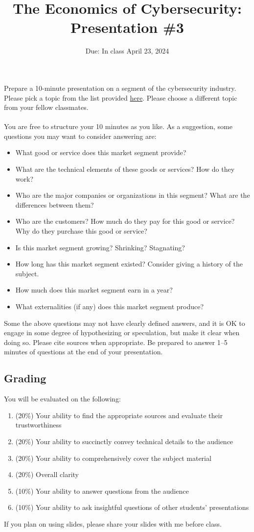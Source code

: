 \documentclass[11pt]{article}
\title{The Economics of Cybersecurity: Presentation \#3}
\author{}
\date{Due: In class April 23, 2024}
\begin{document}
\maketitle

Prepare a 10-minute presentation on a segment of the cybersecurity industry. Please pick a topic from the list provided \href{https://docs.google.com/spreadsheets/d/1SdaMpeCo4CE8o0U_irGhWmVXJYHybRWoiX4uwZYMhCE/edit#gid=2144152383}{here}. Please choose a different topic from your fellow classmates. 
\\
\\
You are free to structure your 10 minutes as you like. As a suggestion, some questions you may want to consider answering are:
\begin{itemize}
    \item What good or service does this market segment provide?
    \item What are the technical elements of these goods or services? How do they work?
    \item Who are the major companies or organizations in this segment? What are the differences between them? 
    \item Who are the customers? How much do they pay for this good or service? Why do they purchase this good or service?
    \item Is this market segment growing? Shrinking? Stagnating?
    \item How long has this market segment existed? Consider giving a history of the subject.
    \item How much does this market segment earn in a year? 
    \item What externalities (if any) does this market segment produce?
\end{itemize}

Some the above questions may not have clearly defined answers, and it is OK to engage in some degree of hypothesizing or speculation, but make it clear when doing so. Please cite sources when appropriate. 
Be prepared to answer 1--5 minutes of questions at the end of your presentation.


\subsection*{Grading}

You will be evaluated on the following:
\begin{enumerate}
    \item (20\%) Your ability to find the appropriate sources and evaluate their trustworthiness
    \item (20\%) Your ability to succinctly convey technical details to the audience
    \item (20\%) Your ability to comprehensively cover the subject material
    \item (20\%) Overall clarity
    \item (10\%) Your ability to answer questions from the audience
    \item (10\%) Your ability to ask insightful questions of other students' presentations
\end{enumerate}

If you plan on using slides, please share your slides with me before class.
\end{document}
